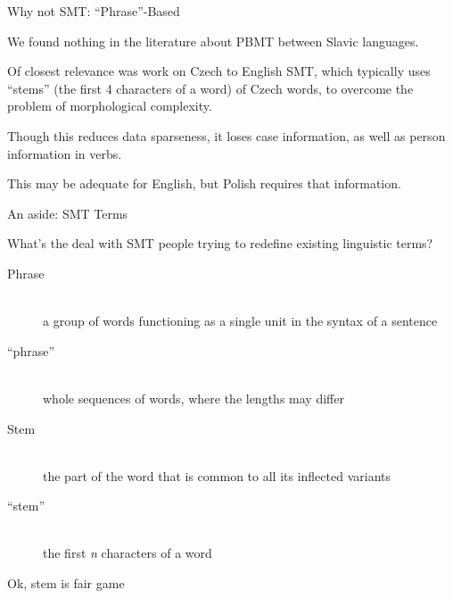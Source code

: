 \documentclass{beamer}
\begin{document}
%
%
%
%
%
%

\begin{frame}{Why not SMT: ``Phrase''-Based}

We found nothing in the literature about PBMT between Slavic languages.

Of closest relevance was work on Czech to English SMT, which typically
uses ``stems'' (the first 4 characters of a word) of Czech words, to
overcome the problem of morphological complexity.

Though this reduces data sparseness, it loses case information, as
well as person information in verbs. 

This may be adequate for English, but Polish requires that information.
\end{frame}

\begin{frame}{An aside: SMT Terms}

What's the deal with SMT people trying to redefine existing linguistic terms?

\begin{description}
  \item[Phrase] \hfill \\
  a group of words functioning as a single unit in the syntax of a sentence
  \item[``phrase''] \hfill \\
  whole sequences of words, where the lengths may differ
  \item[Stem] \hfill \\
  the part of the word that is common to all its inflected variants
  \item[``stem''] \hfill \\
  the first {\em n} characters of a word
\end{description}

\footnotesize{Ok, stem is fair game}

\end{frame}
\end{document}

